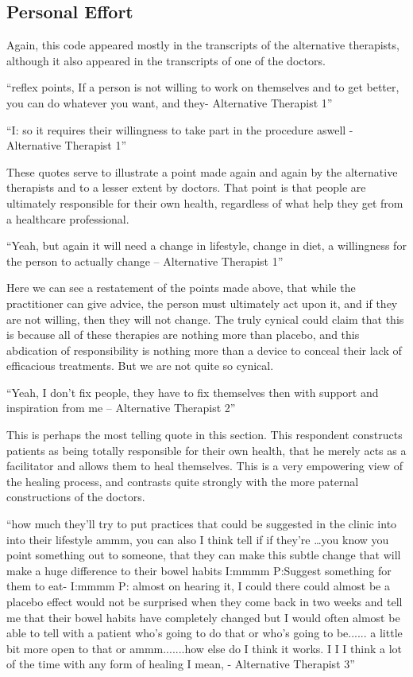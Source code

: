 \subsection{Personal Effort}

Again, this code appeared mostly in the transcripts of the alternative therapists, although it also appeared in the transcripts of one of the doctors. 

``reflex points, If a person is not willing to work on themselves and to get better, you can do whatever you want, and they- Alternative Therapist 1''

``I: so it requires their willingness to take part in the procedure aswell - Alternative Therapist 1''

These quotes serve to illustrate a point made again and again by the alternative therapists and to a lesser extent by doctors. That point is that people are ultimately responsible for their own health, regardless of what help they get from a healthcare professional. 

``Yeah, but again it will need a change in lifestyle, change in diet, a willingness for the person to actually change – Alternative Therapist 1''

Here we can see a restatement of the points made above, that while the practitioner can give advice, the person must ultimately act upon it, and if they are not willing, then they will not change. The truly cynical could claim that this is because all of these therapies are nothing more than placebo, and this abdication of responsibility is nothing more than a device to conceal their lack of efficacious treatments. But we are not quite so cynical. 

``Yeah, I don't fix people, they have to fix themselves then with support and inspiration from me – Alternative Therapist 2''

This is perhaps the most telling quote in this section. This respondent constructs patients as being totally responsible for their own health, that he merely acts as a facilitator and allows them to heal themselves. This is a very empowering view of the healing process, and contrasts quite strongly with the more paternal constructions of the doctors. 

``how much they'll try to put practices that could be suggested in the clinic into into their lifestyle ammm, you can also I think tell if if they're \ldots you know you point something out to someone, that they can make this subtle  change that will make a huge difference to their bowel habits  
I:mmmm
P:Suggest something for them to eat-
I:mmmm
P: almost on hearing it, I could there could almost be a placebo effect would not be surprised when they come back in two weeks and tell me that their bowel habits have completely changed but I would often almost be able to tell with a patient who's going to do that or who's going to be...... a little bit more open to that or ammm.......how else do I think it works. I I I think a lot of the time with any form of healing I mean, - Alternative Therapist 3''

